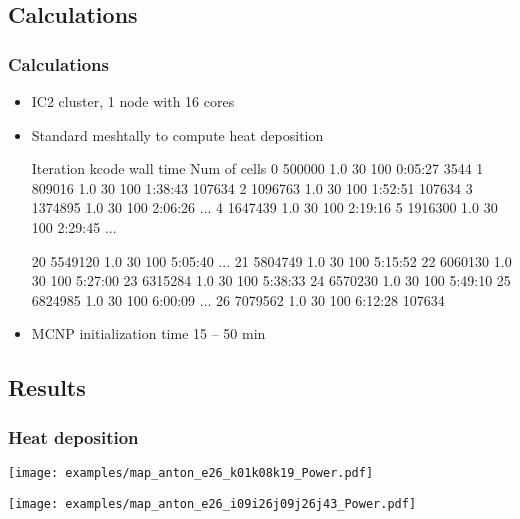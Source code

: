 \subsection{Calculations}
\begin{frame}[fragile]
    \frametitle{Calculations}
    \begin{itemize}
        \item IC2 cluster, 1 node with 16 cores
        \item Standard meshtally to compute heat deposition

            \begin{bashcode}
        Iteration        kcode                 wall time    Num of cells            
                0       500000  1.0  30  100     0:05:27            3544 
                1       809016  1.0  30  100     1:38:43          107634
                2      1096763  1.0  30  100     1:52:51          107634
                3      1374895  1.0  30  100     2:06:26             ...  
                4      1647439  1.0  30  100     2:19:16          
                5      1916300  1.0  30  100     2:29:45             ... 

               20      5549120  1.0  30  100     5:05:40             ...
               21      5804749  1.0  30  100     5:15:52 
               22      6060130  1.0  30  100     5:27:00 
               23      6315284  1.0  30  100     5:38:33 
               24      6570230  1.0  30  100     5:49:10 
               25      6824985  1.0  30  100     6:00:09             ...
               26      7079562  1.0  30  100     6:12:28          107634

            \end{bashcode}
        \item MCNP initialization time 15 -- 50 min

    \end{itemize}
\end{frame}

\subsection{Results}

\begin{frame}[fragile]
    \frametitle{Heat deposition}
    \texttt{[image: examples/map\_anton\_e26\_k01k08k19\_Power.pdf]}

    \texttt{[image: examples/map\_anton\_e26\_i09i26j09j26j43\_Power.pdf]}
\end{frame}

